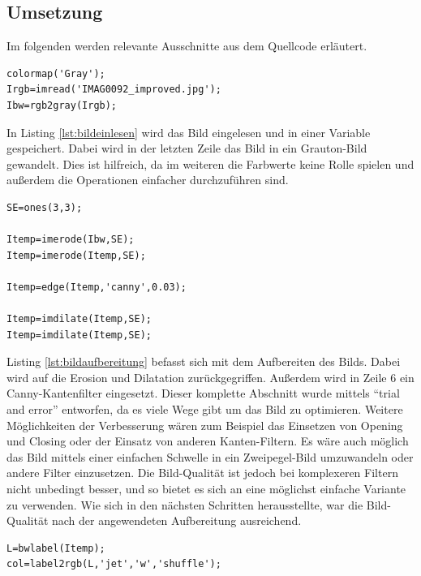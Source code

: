 \documentclass[a4paper,DIV=calc,ngerman]{scrartcl}
\begin{document}
\subsection{Umsetzung}
\label{sec:a1umsetzung}
Im folgenden werden relevante Ausschnitte aus dem Quellcode erläutert.

\begin{lstlisting}[frame=single, caption={Bild einlesen}, label={lst:bildeinlesen}]
colormap('Gray');
Irgb=imread('IMAG0092_improved.jpg');
Ibw=rgb2gray(Irgb);
\end{lstlisting}

In Listing \ref{lst:bildeinlesen} wird das Bild eingelesen und in einer Variable gespeichert. Dabei wird in der letzten Zeile das Bild in ein Grauton-Bild gewandelt. Dies ist hilfreich, da im weiteren die Farbwerte keine Rolle spielen und außerdem die Operationen einfacher durchzuführen sind.

\begin{lstlisting}[frame=single, caption={Bild-Aufbereitung}, label={lst:bildaufbereitung}]
SE=ones(3,3);

Itemp=imerode(Ibw,SE);
Itemp=imerode(Itemp,SE);

Itemp=edge(Itemp,'canny',0.03);

Itemp=imdilate(Itemp,SE);
Itemp=imdilate(Itemp,SE);
\end{lstlisting}

Listing \ref{lst:bildaufbereitung} befasst sich mit dem Aufbereiten des Bilds. Dabei wird auf die Erosion und Dilatation zurückgegriffen. Außerdem wird in Zeile 6 ein Canny-Kantenfilter eingesetzt. Dieser komplette Abschnitt wurde mittels "`trial and error"' entworfen, da es viele Wege gibt um das Bild zu optimieren. Weitere Möglichkeiten der Verbesserung wären zum Beispiel das Einsetzen von Opening und Closing oder der Einsatz von anderen Kanten-Filtern. Es wäre auch möglich das Bild mittels einer einfachen Schwelle in ein Zweipegel-Bild umzuwandeln oder andere Filter einzusetzen. Die Bild-Qualität ist jedoch bei komplexeren Filtern nicht unbedingt besser, und so bietet es sich an eine möglichst einfache Variante zu verwenden. Wie sich in den nächsten Schritten herausstellte, war die Bild-Qualität nach der angewendeten Aufbereitung ausreichend.


\begin{lstlisting}[frame=single, caption={Objekt-Segmentierung}, label={lst:segmentierung}]
L=bwlabel(Itemp);
col=label2rgb(L,'jet','w','shuffle');
\end{lstlisting}
\end{document}
